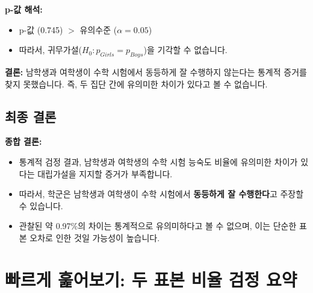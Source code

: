 \documentclass[11pt,a4paper]{article}
\begin{document}
\begin{summarybox}
\textbf{p-값 해석:}
\begin{itemize}
    \item p-값 (0.745) $>$ 유의수준 ($\alpha=0.05$)
    \item 따라서, 귀무가설($H_0: p_{Girls} = p_{Boys}$)을 기각할 수 없습니다.
\end{itemize}
\textbf{결론:} 남학생과 여학생이 수학 시험에서 동등하게 잘 수행하지 않는다는 통계적 증거를 찾지 못했습니다. 즉, 두 집단 간에 유의미한 차이가 있다고 볼 수 없습니다.
\end{summarybox}

\subsection{최종 결론}

\begin{summarybox}
\textbf{종합 결론:}
\begin{itemize}
    \item 통계적 검정 결과, 남학생과 여학생의 수학 시험 능숙도 비율에 유의미한 차이가 있다는 대립가설을 지지할 증거가 부족합니다.
    \item 따라서, 학군은 남학생과 여학생이 수학 시험에서 \textbf{동등하게 잘 수행한다}고 주장할 수 있습니다.
    \item 관찰된 약 0.97\%의 차이는 통계적으로 유의미하다고 볼 수 없으며, 이는 단순한 표본 오차로 인한 것일 가능성이 높습니다.
\end{itemize}
\end{summarybox}

\newpage
\section*{빠르게 훑어보기: 두 표본 비율 검정 요약}
\end{document}
